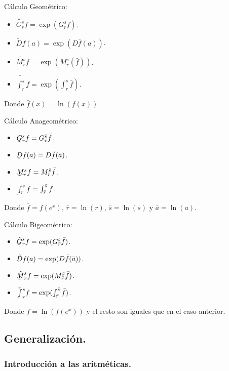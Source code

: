 Cálculo Geométrico:

\begin{itemize}
	\item $\tilde{G_r^s}f = \exp(G_r^s \bar{f})$.
	\item $\tilde{D}f(a) = \exp(D\bar{f}(a))$.
	\item $\tilde{M_r^s}f = \exp(M_r^s(\bar{f}))$.
	\item $\tilde{\int_r^s} f = \exp(\int_r^s \bar{f})$.
\end{itemize}

Donde $\bar{f}(x) = \ln(f(x))$.

Cálculo Anageométrico:

\begin{itemize}
	\item $\underaccent{\tilde}{G}_r^s f = G_{\bar{r}}^{\bar{s}} \bar{f}$.
	\item $\underaccent{\tilde}{D}f(a) = D\bar{f}(\bar{a})$.
	\item $\underaccent{\tilde}{M}_r^sf = M_{\bar{r}}^{\bar{s}} \bar{f}$.
	\item $\underaccent{\tilde}{\int}_r^s f = \int_{\bar{r}}^{\bar{s}} \bar{f}$.
\end{itemize}

Donde $\bar{f} = f(e^x)$, $\bar{r} = \ln(r)$, $\bar{s} = \ln(s)$ y $\bar{a} = \ln(a)$.

Cálculo Bigeométrico:

\begin{itemize}
	\item $\tilde{\underaccent{\tilde}{G}}_r^s f = \exp(G_{\bar{r}}^{\bar{s}} \bar{f})$.
	\item $\tilde{\underaccent{\tilde}{D}}f(a) = \exp(D\bar{f}(\bar{a}))$.
	\item $\tilde{\underaccent{\tilde}{M}}_r^s f = \exp(M_{\bar{r}}^{\bar{s}} \bar{f})$.
	\item $\tilde{\underaccent{\tilde}{\int}}_r^s f = \exp(\int_{\bar{r}}^{\bar{s}} \bar{f})$.
\end{itemize}

Donde $\bar{f} = \ln(f(e^x))$ y el resto son iguales que en el caso anterior.

\subsection{Generalización.} \label{general}

\subsubsection{Introducción a las aritméticas.}


